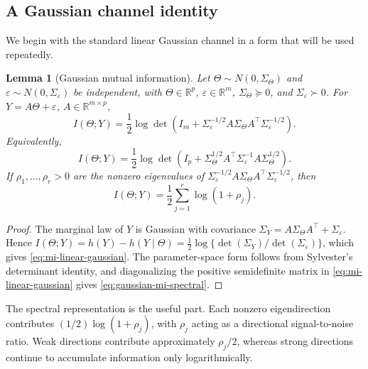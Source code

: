 \documentclass[11pt]{article}
\theoremstyle{plain}
\newtheorem{lemma}{Lemma}
\theoremstyle{definition}
\theoremstyle{remark}
\begin{document}
\subsection{A Gaussian channel identity}
\label{subsec:gaussian-channel}

We begin with the standard linear Gaussian channel in a form that will be used repeatedly.

\begin{lemma}[Gaussian mutual information]
	\label{lem:gaussian-channel-mi}
	Let \(\Theta\sim N(0,\Sigma_\Theta)\) and \(\varepsilon\sim N(0,\Sigma_\varepsilon)\) be independent, with \(\Theta\in\mathbb R^p\), \(\varepsilon\in\mathbb R^m\), \(\Sigma_\Theta\succeq0\), and \(\Sigma_\varepsilon\succ0\). For \(Y=A\Theta+\varepsilon\), \(A\in\mathbb R^{m\times p}\),
	\begin{equation}
		\label{eq:mi-linear-gaussian}
		I(\Theta;Y)
		=
		\frac12\log\det\!\left(
		I_m+\Sigma_\varepsilon^{-1/2}A\Sigma_\Theta A^\top\Sigma_\varepsilon^{-1/2}
		\right).
	\end{equation}
	Equivalently,
	\[
	I(\Theta;Y)
	=
	\frac12\log\det\!\left(
	I_p+\Sigma_\Theta^{1/2}A^\top\Sigma_\varepsilon^{-1}A\Sigma_\Theta^{1/2}
	\right).
	\]
	If \(\rho_1,\ldots,\rho_r>0\) are the nonzero eigenvalues of
	\(\Sigma_\varepsilon^{-1/2}A\Sigma_\Theta A^\top\Sigma_\varepsilon^{-1/2}\), then
	\begin{equation}
		\label{eq:gaussian-mi-spectral}
		I(\Theta;Y)=\frac12\sum_{j=1}^r\log(1+\rho_j).
	\end{equation}
\end{lemma}

\begin{proof}
	The marginal law of \(Y\) is Gaussian with covariance \(\Sigma_Y=A\Sigma_\Theta A^\top+\Sigma_\varepsilon\). Hence \(I(\Theta;Y)=h(Y)-h(Y\mid\Theta)=\frac12\log\{\det(\Sigma_Y)/\det(\Sigma_\varepsilon)\}\), which gives \eqref{eq:mi-linear-gaussian}. The parameter-space form follows from Sylvester's determinant identity, and diagonalizing the positive semidefinite matrix in \eqref{eq:mi-linear-gaussian} gives \eqref{eq:gaussian-mi-spectral}.
\end{proof}

The spectral representation is the useful part. Each nonzero eigendirection contributes \((1/2)\log(1+\rho_j)\), with \(\rho_j\) acting as a directional signal-to-noise ratio. Weak directions contribute approximately \(\rho_j/2\), whereas strong directions continue to accumulate information only logarithmically.
\end{document}
